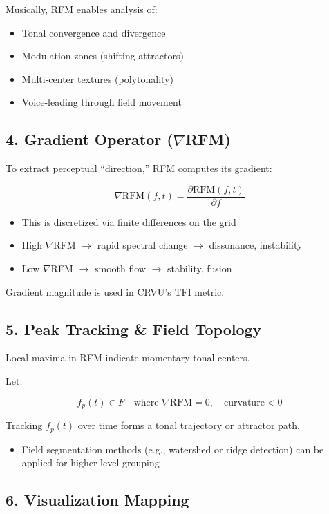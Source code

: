 Musically, RFM enables analysis of:

\begin{itemize}
    \item Tonal convergence and divergence
    \item Modulation zones (shifting attractors)
    \item Multi-center textures (polytonality)
    \item Voice-leading through field movement
\end{itemize}

\subsection*{4. Gradient Operator ($\nabla$RFM)}

To extract perceptual “direction,” RFM computes its gradient:

\[
\nabla \text{RFM}(f, t) = \frac{\partial \text{RFM}(f, t)}{\partial f}
\]

\begin{itemize}
    \item This is discretized via finite differences on the grid
    \item High $\nabla$RFM $\rightarrow$ rapid spectral change $\rightarrow$ dissonance, instability
    \item Low $\nabla$RFM $\rightarrow$ smooth flow $\rightarrow$ stability, fusion
\end{itemize}

Gradient magnitude is used in CRVU’s TFI metric.

\subsection*{5. Peak Tracking \& Field Topology}

Local maxima in RFM indicate momentary tonal centers.

Let:

\[
f_p(t) \in F \quad \text{where } \nabla \text{RFM} = 0, \quad \text{curvature} < 0
\]

Tracking $f_p(t)$ over time forms a tonal trajectory or attractor path.

\begin{itemize}
    \item Field segmentation methods (e.g., watershed or ridge detection) can be applied for higher-level grouping
\end{itemize}

\subsection*{6. Visualization Mapping}

